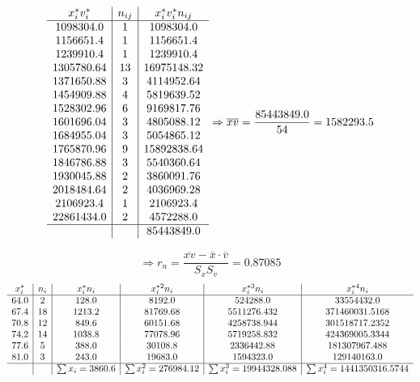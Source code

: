 \documentclass[9pt]{article}
\begin{document}
\[\begin{array}{c|c|c}
x_i^*v_i^* & n_{ij} & x_i^*v_i^*n_{ij} \\
\hline
1098304.0 & 1 & 1098304.0\\
1156651.4 & 1 & 1156651.4\\
1239910.4 & 1 & 1239910.4\\
1305780.64 & 13 & 16975148.32\\
1371650.88 & 3 & 4114952.64\\
1454909.88 & 4 & 5819639.52\\
1528302.96 & 6 & 9169817.76\\
1601696.04 & 3 & 4805088.12\\
1684955.04 & 3 & 5054865.12\\
1765870.96 & 9 & 15892838.64\\
1846786.88 & 3 & 5540360.64\\
1930045.88 & 2 & 3860091.76\\
2018484.64 & 2 & 4036969.28\\
2106923.4 & 1 & 2106923.4\\
22861434.0 & 2 & 4572288.0\\
\hline
& & 85443849.0
\end{array}\Rightarrow \overline{xv}=\dfrac{85443849.0}{54}=1582293.5\]

\[\Rightarrow r_n=\dfrac{\overline{xv}-\overline{x}\cdot\overline{v}}{S_xS_v}=0.87085\]
\[\begin{array}{c|c|c|c|c|c}
x_i^* & n_i & x_i^*n_i & x_i^{*2}n_i & x_i^{*3}n_i & x_i^{*4}n_i \\
\hline
64.0 & 2 & 128.0 & 8192.0 & 524288.0 & 33554432.0\\
67.4 & 18 & 1213.2 & 81769.68 & 5511276.432 & 371460031.5168\\
70.8 & 12 & 849.6 & 60151.68 & 4258738.944 & 301518717.2352\\
74.2 & 14 & 1038.8 & 77078.96 & 5719258.832 & 424369005.3344\\
77.6 & 5 & 388.0 & 30108.8 & 2336442.88 & 181307967.488\\
81.0 & 3 & 243.0 & 19683.0 & 1594323.0 & 129140163.0\\
\hline
& & \sum x_i=3860.6 & \sum x_i^2=276984.12 & \sum x_i^3=19944328.088 & \sum x_i^4=1441350316.5744
\end{array}\]
\end{document}
